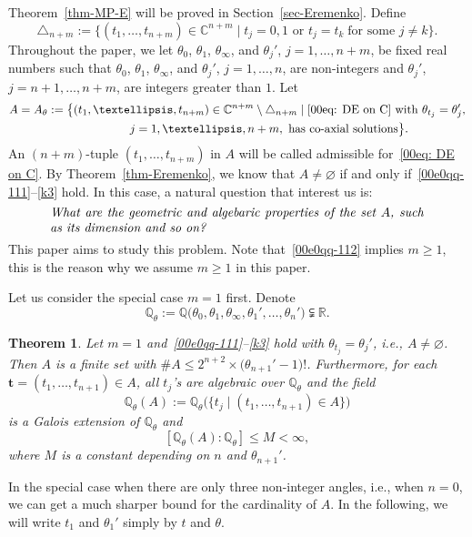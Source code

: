 \documentclass[11pt]{article}
\numberwithin{equation}{section}
\numberwithin{equation}{section}
\newtheorem{Theorem}{Theorem}[section]
\def\Q{\mathbb Q}
\def\R{\mathbb R}
\begin{document}
Theorem~\ref{thm-MP-E} will be proved in Section~\ref{sec-Eremenko}.
Define
\[
 \triangle_{n+m}:=\bigl\{(t_1,\dots,t_{n+m})\in \mathbb{C}^{n+m}\mid
 t_j=0,1 \text{ or } t_j=t_k\;\text{for some $j\neq k$}\bigr\}.
\]
Throughout the paper, we let $\theta_0$, $\theta_1$,
$\theta_\infty$, and $\theta_j'$, $j=1,\dots,n+m$, be fixed real
numbers such that $\theta_0$, $\theta_1$, $\theta_\infty$, and
$\theta_j'$, $j=1,\dots,n$, are non-integers and $\theta_j'$,
$j=n+1,\dots,n+m$, are integers greater than $1$.
Let
\begin{gather}
 A=A_\theta:=\bigl\{(t_1,\dots,t_{n+m})\in \mathbb{C}^{n+m}\setminus
 \triangle_{n+m}\mid \text{\eqref{00eq: DE on C}
 with}\ \theta_{t_j}=\theta_j',
\nonumber\\ \hphantom{ A=A_\theta:=\{}{}
j=1,\dots,n+m, \
 \text{has co-axial solutions}\bigr\}.\label{eq: set A}
\end{gather}
An $(n+m)$-tuple $(t_1,\dots,t_{n+m})$ in $A$ will be called
admissible for~\eqref{00eq: DE on C}.
By Theorem~\ref{thm-Eremenko}, we know that $A\neq\varnothing$ if and
only if~\eqref{00e0qq-111}--\eqref{k3} hold. In this case, a natural
question that interest us is:
\[\parbox{\dimexpr\linewidth-5em}{\it
 What are the geometric and algebaric properties of the set $A$, such as its dimension and so on?
 }\]
This paper aims to study this problem. Note that~\eqref{00e0qq-112}
implies $m\geq 1$, this is the reason why we assume $m\geq 1$ in this paper.

Let us consider the special case $m=1$ first. Denote
\[
 \Q_{\theta}:=\Q\bigl(\theta_0,\theta_1,\theta_\infty,\theta_1',
 \dots,\theta_n'\bigr)\subsetneqq \R.
\]

\begin{Theorem}\label{00thm-2-2}
Let $m=1$ and~\eqref{00e0qq-111}--\eqref{k3} hold with
$\theta_{t_j}=\theta_j'$, i.e., $A\neq\varnothing$.
Then $A$ is a finite set with $\# A\leq
2^{n+2}\times\bigl(\theta_{n+1}'-1\bigr)!$. Furthermore, for each
$\boldsymbol t=(t_1,\dots,t_{n+1})\in A$, all $t_j$'s are algebraic
over $\Q_{\theta}$ and the field
\[\Q_\theta(A):=\Q_{\theta}\bigl(\bigl\{t_j \mid (t_1,\dots,t_{n+1})\in A\bigr\}\bigr)\]
is a Galois extension of $\Q_{\theta}$ and
\[[\Q_\theta(A) : \Q_\theta]\leq M<\infty,\]
where $M$ is a constant depending on $n$ and $\theta_{n+1}'$.
\end{Theorem}

In the special case when there are only three
non-integer angles, i.e., when $n=0$, we can get a much sharper bound
for the cardinality of $A$. In the following, we will write
$t_1$ and $\theta_1'$ simply by $t$ and $\theta$.
\end{document}
